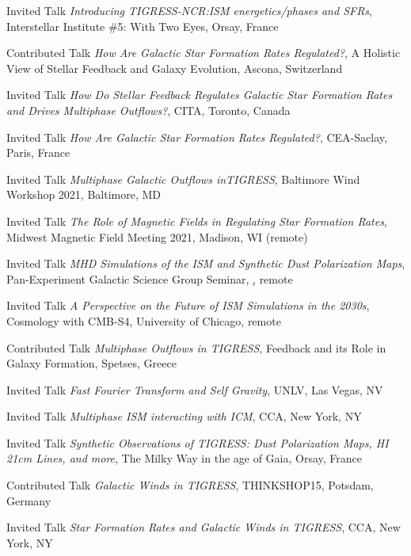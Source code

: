 \documentclass[12pt]{article}
\begin{document}
{Invited Talk}
{\emph{Introducing TIGRESS-NCR:ISM energetics/phases and SFRs},
Interstellar Institute \#5: With Two Eyes,
Orsay, France}

{Contributed Talk}
{\emph{How Are Galactic Star Formation Rates Regulated?},
A Holistic View of Stellar Feedback and Galaxy Evolution,
Ascona, Switzerland}

{Invited Talk}
{\emph{How Do Stellar Feedback Regulates Galactic Star Formation Rates and Drives Multiphase Outflows?},
CITA,
Toronto, Canada}

{Invited Talk}
{\emph{How Are Galactic Star Formation Rates Regulated?},
CEA-Saclay,
Paris, France}

{Invited Talk}
{\emph{Multiphase Galactic Outflows inTIGRESS},
Baltimore Wind Workshop 2021,
Baltimore, MD}

{Invited Talk}
{\emph{The Role of Magnetic Fields in Regulating Star Formation Rates},
Midwest Magnetic Field Meeting 2021,
Madison, WI (remote)}

{Invited Talk}
{\emph{MHD Simulations of the ISM and Synthetic Dust Polarization Maps},
Pan-Experiment Galactic Science Group Seminar,
\href{https://galsci.github.io}, remote}

{Invited Talk}
{\emph{A Perspective on the Future of ISM Simulations in the 2030s},
Cosmology with CMB-S4,
University of Chicago, remote}

{Contributed Talk}
{\emph{Multiphase Outflows in TIGRESS},
Feedback and its Role in Galaxy Formation,
Spetses, Greece}

{Invited Talk}
{\emph{Fast Fourier Transform and Self Gravity},
UNLV,
Las Vegas, NV}

{Invited Talk}
{\emph{Multiphase ISM interacting with ICM},
CCA,
New York, NY}

{Invited Talk}
{\emph{Synthetic Observations of TIGRESS: Dust Polarization Maps, HI 21cm Lines, and more},
The Milky Way in the age of Gaia,
Orsay, France}

{Contributed Talk}
{\emph{Galactic Winds in TIGRESS},
THINKSHOP15,
Potsdam, Germany}

{Invited Talk}
{\emph{Star Formation Rates and Galactic Winds in TIGRESS},
CCA,
New York, NY}
\end{document}
